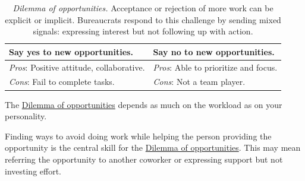 \begin{center}
\begin{table}[H] %
\begin{tabular}{ | m{\dilemmatablewidth}| m{\dilemmatablewidth} | } 
  \hline
  \textbf{Say yes to new opportunities.} & 
  \textbf{Say no to new opportunities.} \\ 
  \hline
  \textit{Pros}: Positive attitude, collaborative. &
  \textit{Pros}: Able to prioritize and focus. \\
  \hline
  \textit{Cons}: Fail to complete tasks. &
  \textit{Cons}: Not a team player. \\  
  \hline
\end{tabular}
\caption{
\textit{Dilemma of opportunities.}
Acceptance or rejection of more work can be explicit or implicit. Bureaucrats respond to this challenge by sending mixed signals: expressing interest but not following up with action.
}
\label{table:dilemma-new-opportunties-yes-no}
\end{table}
\end{center}

The \hyperref[table:dilemma-new-opportunties-yes-no]{Dilemma of opportunities} 
\iftoggle{printedonpaper}{ (\ref{table:dilemma-new-opportunties-yes-no})}{} depends as much on the workload as on your personality. 

Finding ways to avoid doing work while helping the person providing the opportunity is the central skill for the \hyperref[table:dilemma-new-opportunties-yes-no]{Dilemma of opportunities}. This may mean referring the opportunity to another coworker or expressing support but not investing effort. 



